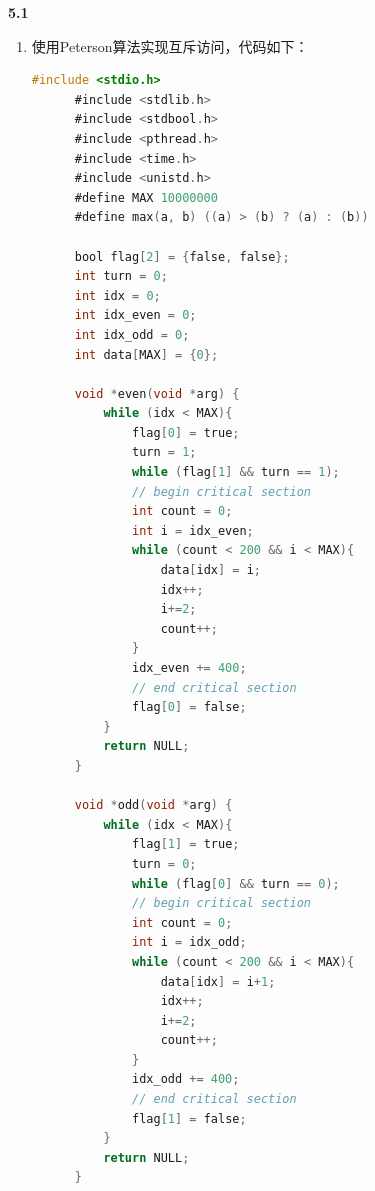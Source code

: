 \documentclass[UTF8]{report}
\newcommand{\tbf}[1]{\textbf{#1}}
\begin{document}
\pagestyle{fancy}

\maketitle

\noindent
\tbf{5.1}

\begin{enumerate}[label=(\arabic*)]
    \item 使用Peterson算法实现互斥访问，代码如下：
    
    \begin{lstlisting}[language=C]
      #include <stdio.h>
      #include <stdlib.h>
      #include <stdbool.h>
      #include <pthread.h>
      #include <time.h>
      #include <unistd.h>
      #define MAX 10000000
      #define max(a, b) ((a) > (b) ? (a) : (b))
      
      bool flag[2] = {false, false};
      int turn = 0;
      int idx = 0;
      int idx_even = 0;
      int idx_odd = 0;
      int data[MAX] = {0};
      
      void *even(void *arg) {
          while (idx < MAX){
              flag[0] = true;
              turn = 1;
              while (flag[1] && turn == 1);
              // begin critical section
              int count = 0;
              int i = idx_even;
              while (count < 200 && i < MAX){
                  data[idx] = i;
                  idx++;
                  i+=2;
                  count++;
              }
              idx_even += 400;
              // end critical section
              flag[0] = false;
          }
          return NULL;
      }
      
      void *odd(void *arg) {
          while (idx < MAX){
              flag[1] = true;
              turn = 0;
              while (flag[0] && turn == 0);
              // begin critical section
              int count = 0;
              int i = idx_odd;
              while (count < 200 && i < MAX){
                  data[idx] = i+1;
                  idx++;
                  i+=2;
                  count++;
              }
              idx_odd += 400;
              // end critical section
              flag[1] = false;
          }
          return NULL;
      }
      

\end{lstlisting}
\end{enumerate}
\end{document}
